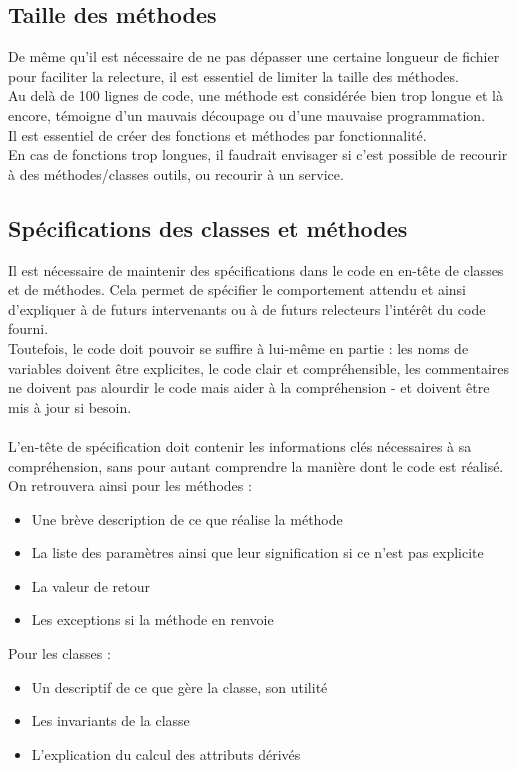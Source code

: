 \documentclass{article}
\begin{document}
        \subsection{Taille des méthodes}

            De même qu'il est nécessaire de ne pas dépasser une certaine longueur de fichier pour faciliter la relecture, il est essentiel de limiter la taille des méthodes. \\
            \indent Au delà de 100 lignes de code, une méthode est considérée bien trop longue et là encore, témoigne d'un mauvais découpage ou d'une mauvaise programmation.\\
            \indent Il est essentiel de créer des fonctions et méthodes par fonctionnalité.\\
            \indent En cas de fonctions trop longues, il faudrait envisager si c'est possible de recourir à des méthodes/classes outils, ou recourir à un service.

        \subsection{Spécifications des classes et méthodes}

            Il est nécessaire de maintenir des spécifications dans le code en en-tête de classes et de méthodes. Cela permet de spécifier le comportement attendu et ainsi d'expliquer à de futurs intervenants ou à de futurs relecteurs l'intérêt du code fourni.\\
            \indent Toutefois, le code doit pouvoir se suffire à lui-même en partie : les noms de variables doivent être explicites, le code clair et compréhensible, les commentaires ne doivent pas alourdir le code mais aider à la compréhension - et doivent être mis à jour si besoin. \\
            \\
            \indent L'en-tête de spécification doit contenir les informations clés nécessaires à sa compréhension, sans pour autant comprendre la manière dont le code est réalisé. On retrouvera ainsi pour les méthodes : 
            \begin{itemize}
                \item Une brève description de ce que réalise la méthode
                \item La liste des paramètres ainsi que leur signification si ce n'est pas explicite
                \item La valeur de retour
                \item Les exceptions si la méthode en renvoie
            \end{itemize}
            Pour les classes :
            \begin{itemize}
                \item Un descriptif de ce que gère la classe, son utilité
                \item Les invariants de la classe
                \item L'explication du calcul des attributs dérivés
            \end{itemize}
\end{document}
